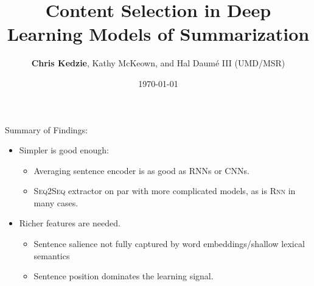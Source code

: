 \documentclass{beamer}
\title[Content in DL Sum.]{Content Selection in Deep Learning Models of Summarization} %
\author[Chris Kedzie]{\textbf{Chris Kedzie}, Kathy McKeown, and Hal Daum\'e III (UMD/MSR)} %
\institute[Columbia U.] %
{
Columbia University \\ %
\medskip
\textit{kedzie@cs.columbia.edu} %
}
\date{\today} %
\begin{document}
\begin{frame}
\titlepage 
\end{frame}









\begin{frame}

    Summary of Findings:
    \begin{itemize}
        \item<1-> Simpler is good enough:
            \begin{itemize}
        \item<2-> Averaging sentence encoder is as good as RNNs or CNNs.
        \item<3-> \textsc{Seq2Seq} extractor on par with more complicated models, as is \textsc{Rnn} in many cases.
    \end{itemize}
        \item<4-> Richer features are needed.
    \begin{itemize}
        \item<5-> Sentence salience not fully captured by word embeddings/shallow lexical semantics
        \item<6-> Sentence position dominates the learning signal. 
    \end{itemize}
    \end{itemize}



\end{frame}
\end{document}
